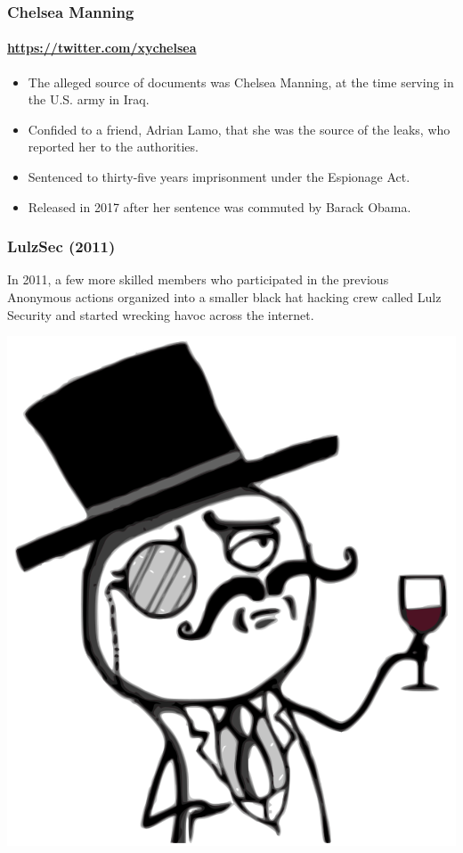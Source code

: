\documentclass[aspectratio=169,usenames,dvipsnames]{beamer}
\begin{document}
\begin{frame}
  \frametitle{Chelsea Manning}
  \framesubtitle{\url{https://twitter.com/xychelsea}}

  \begin{itemize}[<+->]
    \item The alleged source of documents was Chelsea Manning, at the time
      serving in the U.S. army in Iraq.
    \item Confided to a friend, Adrian Lamo, that she was the source of the
      leaks, who reported her to the authorities.
    \item Sentenced to thirty-five years imprisonment under the Espionage Act.
    \item Released in 2017 after her sentence was commuted by Barack Obama.
  \end{itemize}

\end{frame}

\begin{frame}[c]
  \frametitle{LulzSec (2011)}

  In 2011, a few more skilled members who participated in the previous
  Anonymous actions organized into a smaller black hat hacking crew called
  Lulz Security and started wrecking havoc across the internet.

  \centering

  \vspace{1cm}

  \includegraphics[width=\textwidth,height=0.3\textheight,keepaspectratio]{img/lulzsec.png}

\end{frame}
\end{document}
